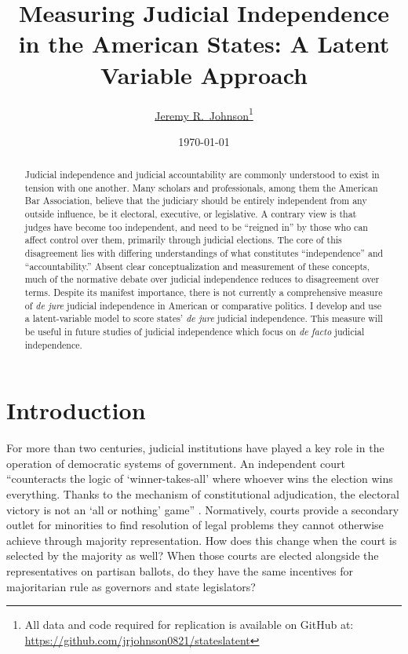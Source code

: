 \documentclass[12pt]{article}
\title{Measuring Judicial Independence in the American States: A Latent Variable Approach}
\author{\href{mailto:Jeremy.Johnson@psu.edu}{Jeremy R.\ Johnson}\thanks{All data and code required for replication is available on GitHub at: \url{https://github.com/jrjohnson0821/stateslatent}}}
\affil{Pennsylvania State University}
\date{\today}
\begin{document}
\maketitle
\thispagestyle{empty}
	
\begin{abstract}
Judicial independence and judicial accountability are commonly understood to exist in tension with one another. Many scholars and professionals, among them the American Bar Association, believe that the judiciary should be entirely independent from any outside influence, be it electoral, executive, or legislative. A contrary view is that judges have become too independent, and need to be “reigned in” by those who can affect control over them, primarily through judicial elections. The core of this disagreement lies with differing understandings of what constitutes “independence” and “accountability.” Absent clear conceptualization and measurement of these concepts, much of the normative debate over judicial independence reduces to disagreement over terms. Despite its manifest importance, there is not currently a comprehensive measure of \textit{de jure} judicial independence in American or comparative politics. I develop and use a latent-variable model to score states' \textit{de jure} judicial independence. This measure will be useful in future studies of judicial independence which focus on \textit{de facto} judicial independence.
\end{abstract}
	
	
\pagebreak\doublespacing
\setcounter{page}{1}

\section{Introduction}\label{Intro}
For more than two centuries, judicial institutions have played a key role in the operation of democratic systems of government.  An independent court ``counteracts the logic of `winner-takes-all' where whoever wins the election wins everything. Thanks to the mechanism of constitutional adjudication, the electoral victory is not an `all or nothing' game'' \citep[1685]{Ferejohn2003}. Normatively, courts provide a secondary outlet for minorities to find resolution of legal problems they cannot otherwise achieve through majority representation.  How does this change when the court is selected by the majority as well?  When those courts are elected alongside the representatives on partisan ballots, do they have the same incentives for majoritarian rule as governors and state legislators?
\end{document}
